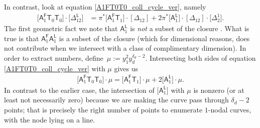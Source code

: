 \documentclass[pdftex]{sigma}
\numberwithin{equation}{section}
\begin{document}
In contrast, look at equation \eqref{A1FT0T0_coll_cycle_ver}, namely
\begin{align*}
\bigl[\mathsf{A}_1^{\mathsf{F}}\mathsf{T}_0 \mathsf{T}_0\bigr] \cdot \bigl[\Delta^{\mathsf{L}}_{12}\bigr] &  =  \pi^*\bigl[\mathsf{A}_1^{\mathsf{F}}\mathsf{T}_1\bigr]\cdot [\Delta_{12}] + 2\pi^*\bigl[\mathsf{A}_1^{\mathsf{L}}\bigr]\cdot [\Delta_{12}]\cdot
\bigl[\Delta_{2}^1\bigr].
\end{align*}
The first geometric fact we note that $\mathsf{A}_1^{\mathsf{L}}$ is \emph{not} a subset of the
closure .
What is true is that $\mathsf{A}_1^{\mathsf{F}}\mathsf{A}_1^{\mathsf{L}}$
is a subset of the closure (which for dimensional reasons, does not contribute when
we intersect with a class of complimentary dimension). In order to extract
numbers, define~$\mu := y_1^2 y_d^{\delta_d-2}$.
Intersecting both sides of equation \eqref{A1FT0T0_coll_cycle_ver}
with $\mu$ gives us
\begin{align*}
\bigl[\mathsf{A}_1^{\mathsf{F}}\mathsf{T}_0 \mathsf{T}_0\bigr] \cdot \mu  =
\bigl[\mathsf{A}_1^{\mathsf{F}}\mathsf{T}_1\bigr]\cdot \mu + 2 \bigl[\mathsf{A}_1^{\mathsf{L}}\bigr]\cdot \mu.
\end{align*}
In contrast to the earlier case, the intersection of
$\bigl[\mathsf{A}_1^{\mathsf{L}}\bigr]$ with $\mu$ is nonzero (or at least not necessarily zero)
because we are making the curve pass through $\delta_d-2$ points; that is precisely the right number
of points to enumerate $1$-nodal curves, with the node lying on a line.
\end{document}
